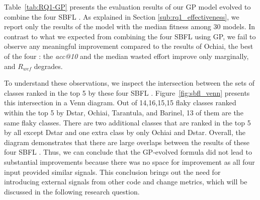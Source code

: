 Table~\ref{tab:RQ1-GP} presents the evaluation results of our GP model evolved to combine the four SBFL \formulas.
As explained in Section \ref{sub:rq1_effectiveness}, we report only the results of the model with the median fitness among 30 models. 
In contrast to what we expected from combining the four SBFL \formulas using GP, we fail to observe any meaningful improvement compared to the results of Ochiai, the best of the four \formulas: 
the \textit{acc@10} and the median wasted effort improve only marginally, and $R_{wef}$ degrades. 


\begin{table}[t!]
\caption{RQ1: The effectiveness of GP evolved \formulas using Ochiai, Barinel, Tarantula, and DStar. \label{tab:RQ1-GP}\centering}
\centering
{}
\end{table}

To understand these observations, we inspect the intersection between the sets of classes ranked in the top 5 by these four SBFL \formulas. Figure~\ref{fig:sbfl_venn} presents this intersection in a Venn diagram.
Out of 14,16,15,15 flaky classes ranked within the top 5 by Dstar, Ochiai, Tarantula, and Barinel, 13 of them are the same flaky classes. There are two additional classes that are ranked in the top 5 by all except Dstar and one extra class by only Ochiai and Dstar.
Overall, the diagram demonstrates that there are large overlaps between the results of these four SBFL \formulas. 
Thus, we can conclude that the GP-evolved formula did not lead to substantial improvements because there was no space for improvement as all four input \formulas provided similar signals. 
This conclusion brings out the need for introducing external signals from other code and change metrics, which will be discussed in the following research question.

